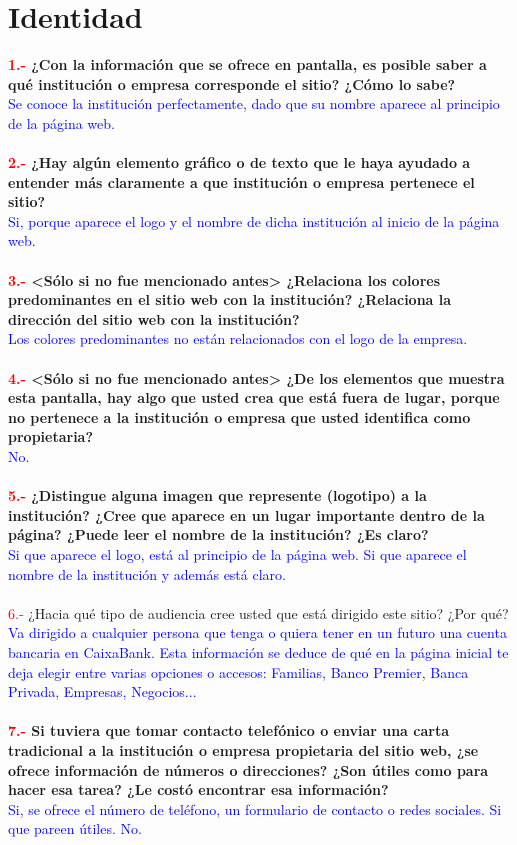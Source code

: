 \documentclass[openany,overnay,a4paper, twoside, 14pt]{book}
\begin{document}
\chapter*{Identidad}
\textbf{\textcolor{red}{1.- }¿Con la información que se ofrece en pantalla, es posible saber a qué institución o empresa corresponde el sitio? ¿Cómo lo sabe?}\\
\textcolor{blue}{Se conoce la institución perfectamente, dado que su nombre aparece al principio de la página web.}\\
\\
\textbf{\textcolor{red}{2.-} ¿Hay algún elemento gráfico o de texto que le haya ayudado a entender más claramente a que institución o empresa pertenece el sitio?}\\
\textcolor{blue}{Si, porque aparece el logo y el nombre de dicha institución al inicio de la página web.}\\
\\
\textbf{\textcolor{red}{3.-} <Sólo si no fue mencionado antes> ¿Relaciona los colores predominantes en el sitio web con la institución? ¿Relaciona la dirección del sitio web con la institución?}\\
\textcolor{blue}{Los colores predominantes no están relacionados con el logo de la empresa.}\\
\\
\textbf{\textcolor{red}{4.-} <Sólo si no fue mencionado antes> ¿De los elementos que muestra esta pantalla, hay algo que usted crea que está fuera de lugar, porque no pertenece a la institución o empresa que usted identifica como propietaria?}\\
\textcolor{blue}{No.}\\
\\
\textbf{\textcolor{red}{5.-} ¿Distingue alguna imagen que represente (logotipo) a la institución? ¿Cree que aparece en un lugar importante dentro de la página? ¿Puede leer el nombre de la institución? ¿Es claro?}\\
\textcolor{blue}{Si que aparece el logo, está al principio de la página web. Si que aparece el nombre de la institución y además está claro.}\\
\\
\textbf{}{\textcolor{red}{6.-} ¿Hacia qué tipo de audiencia cree usted que está dirigido este sitio? ¿Por qué?}\\
\textcolor{blue}{Va dirigido a cualquier persona que tenga o quiera tener en un futuro una cuenta bancaria en CaixaBank. Esta información se deduce de qué en la página inicial te deja elegir entre varias opciones o accesos: Familias, Banco Premier, Banca Privada, Empresas, Negocios... }\\
\\
\textbf{\textcolor{red}{7.-} Si tuviera que tomar contacto telefónico o enviar una carta tradicional a la institución o empresa propietaria del sitio web, ¿se ofrece información de números o direcciones? ¿Son útiles como para hacer esa tarea? ¿Le costó encontrar esa información?}\\
\textcolor{blue}{Si, se ofrece el número de teléfono, un formulario de contacto o redes sociales. Si que pareen útiles. No.}
\end{document}
